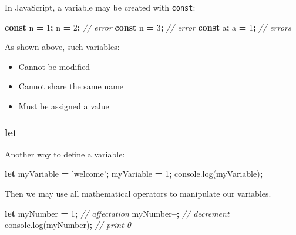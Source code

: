 \documentclass[]{book}
\newenvironment{Shaded}{\begin{snugshade}}{\end{snugshade}}
\newcommand{\AttributeTok}[1]{\textcolor[rgb]{0.77,0.63,0.00}{#1}}
\newcommand{\CommentTok}[1]{\textcolor[rgb]{0.56,0.35,0.01}{\textit{#1}}}
\newcommand{\DecValTok}[1]{\textcolor[rgb]{0.00,0.00,0.81}{#1}}
\newcommand{\KeywordTok}[1]{\textcolor[rgb]{0.13,0.29,0.53}{\textbf{#1}}}
\newcommand{\NormalTok}[1]{#1}
\newcommand{\OperatorTok}[1]{\textcolor[rgb]{0.81,0.36,0.00}{\textbf{#1}}}
\newcommand{\StringTok}[1]{\textcolor[rgb]{0.31,0.60,0.02}{#1}}
\newcommand{\VariableTok}[1]{\textcolor[rgb]{0.00,0.00,0.00}{#1}}
\providecommand{\tightlist}{%
  \setlength{\itemsep}{0pt}\setlength{\parskip}{0pt}}
\begin{document}
In JavaScript, a variable may be created with \texttt{const}:

\begin{Shaded}
\begin{Highlighting}[]
\KeywordTok{const}\NormalTok{ n }\OperatorTok{=} \DecValTok{1}\OperatorTok{;}
\NormalTok{n }\OperatorTok{=} \DecValTok{2}\OperatorTok{;} \CommentTok{// error}
\KeywordTok{const}\NormalTok{ n }\OperatorTok{=} \DecValTok{3}\OperatorTok{;} \CommentTok{// error}
\KeywordTok{const}\NormalTok{ a}\OperatorTok{;}
\NormalTok{a }\OperatorTok{=} \DecValTok{1}\OperatorTok{;} \CommentTok{// errors}
\end{Highlighting}
\end{Shaded}

As shown above, such variables:

\begin{itemize}
\tightlist
\item
  Cannot be modified
\item
  Cannot share the same name
\item
  Must be assigned a value
\end{itemize}

\hypertarget{let}{%
\subsubsection{let}\label{let}}

Another way to define a variable:

\begin{Shaded}
\begin{Highlighting}[]
\KeywordTok{let}\NormalTok{ myVariable }\OperatorTok{=} \StringTok{'welcome'}\OperatorTok{;}
\NormalTok{myVariable }\OperatorTok{=} \DecValTok{1}\OperatorTok{;}
\VariableTok{console}\NormalTok{.}\AttributeTok{log}\NormalTok{(myVariable)}\OperatorTok{;}
\end{Highlighting}
\end{Shaded}

Then we may use all mathematical operators to manipulate our variables.

\begin{Shaded}
\begin{Highlighting}[]
\KeywordTok{let}\NormalTok{ myNumber }\OperatorTok{=} \DecValTok{1}\OperatorTok{;} \CommentTok{// affectation}
\NormalTok{myNumber}\OperatorTok{--;} \CommentTok{// decrement}
\VariableTok{console}\NormalTok{.}\AttributeTok{log}\NormalTok{(myNumber)}\OperatorTok{;} \CommentTok{// print 0}
\end{Highlighting}
\end{Shaded}
\end{document}
